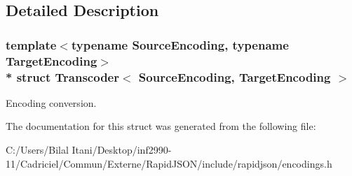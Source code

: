 \subsection{Detailed Description}
\subsubsection*{template$<$typename Source\+Encoding, typename Target\+Encoding$>$\\*
struct Transcoder$<$ Source\+Encoding, Target\+Encoding $>$}

Encoding conversion. 

The documentation for this struct was generated from the following file\+:\begin{DoxyCompactItemize}
\item 
C\+:/\+Users/\+Bilal Itani/\+Desktop/inf2990-\/11/\+Cadriciel/\+Commun/\+Externe/\+Rapid\+J\+S\+O\+N/include/rapidjson/encodings.\+h\end{DoxyCompactItemize}
